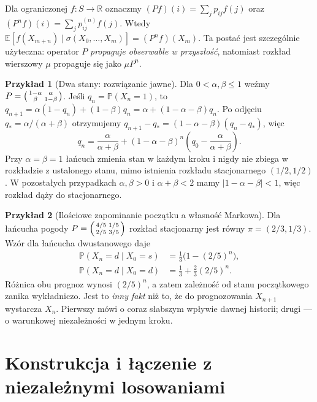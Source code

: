 \documentclass[11pt,a4paper,oneside]{report}
\numberwithin{equation}{chapter}
\theoremstyle{plain}
\theoremstyle{definition}
\newtheorem{przyklad}{Przykład}[chapter]
\theoremstyle{remark}
\newcommand{\R}{\mathbb{R}}
\newcommand{\Prob}{\mathbb{P}}
\newcommand{\E}{\mathbb{E}}
\begin{document}
Dla ograniczonej $f:S\to\R$ oznaczmy
$(Pf)(i)=\sum_jp_{ij}f(j)$ oraz
$(P^nf)(i)=\sum_jp_{ij}^{(n)}f(j)$.
Wtedy
$\E[f(X_{m+n})\mid\sigma(X_0,\ldots,X_m)]
=(P^nf)(X_m)$. Ta postać jest szczególnie użyteczna:
operator $P$ \emph{propaguje obserwable w przyszłość},
natomiast rozkład wierszowy $\mu$ propaguje się jako
$\mu P^n$.

\begin{przyklad}[Dwa stany: rozwiązanie jawne]
Dla $0<\alpha,\beta\leq1$ weźmy
$P=\begin{psmallmatrix}1-\alpha&\alpha\\
\beta&1-\beta\end{psmallmatrix}$.
Jeśli $q_n=\Prob(X_n=1)$, to
$q_{n+1}=\alpha(1-q_n)+(1-\beta)q_n
=\alpha+(1-\alpha-\beta)q_n$.
Po odjęciu $q_*=\alpha/(\alpha+\beta)$ otrzymujemy
$q_{n+1}-q_*=(1-\alpha-\beta)(q_n-q_*)$,
więc
\[
q_n=\frac{\alpha}{\alpha+\beta}
+(1-\alpha-\beta)^n
\left(q_0-\frac{\alpha}{\alpha+\beta}\right).
\]
Przy $\alpha=\beta=1$ łańcuch zmienia stan
w każdym kroku i nigdy nie zbiega w rozkładzie
z ustalonego stanu, mimo istnienia rozkładu
stacjonarnego $(1/2,1/2)$. W pozostałych
przypadkach $\alpha,\beta>0$ i
$\alpha+\beta<2$ mamy $|1-\alpha-\beta|<1$,
więc rozkład dąży do stacjonarnego.
\end{przyklad}


\begin{przyklad}[Ilościowe zapominanie początku a własność Markowa]
Dla łańcucha pogody
$P=\begin{psmallmatrix}4/5&1/5\\2/5&3/5\end{psmallmatrix}$
rozkład stacjonarny jest równy
$\pi=(2/3,1/3)$. Wzór dla łańcucha dwustanowego
daje
\begin{align*}
\Prob(X_n=d\mid X_0=s)&=\frac13\bigl(1-(2/5)^n\bigr),\\
\Prob(X_n=d\mid X_0=d)&=\frac13+\frac23(2/5)^n.
\end{align*}
Różnica obu prognoz wynosi $(2/5)^n$,
a zatem zależność od stanu początkowego zanika
wykładniczo. Jest to \emph{inny fakt} niż to,
że do prognozowania $X_{n+1}$ wystarcza $X_n$.
Pierwszy mówi o coraz słabszym wpływie dawnej historii;
drugi — o warunkowej niezależności w jednym kroku.
\end{przyklad}

\section{Konstrukcja i łączenie z niezależnymi losowaniami}
\end{document}
